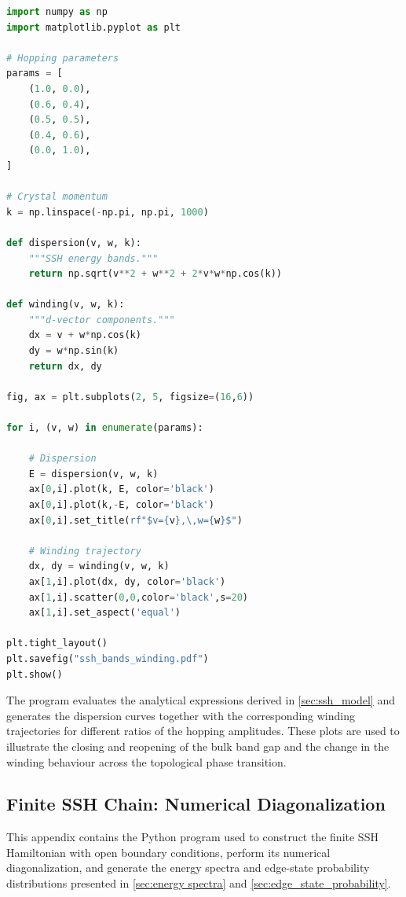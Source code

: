\documentclass[11pt, a4paper]{article}
\begin{document}
\begin{lstlisting}[language=Python, caption={Python implementation used to generate the SSH band structure and winding trajectories.}, label={lst:ssh_plot}]
import numpy as np
import matplotlib.pyplot as plt

# Hopping parameters
params = [
    (1.0, 0.0),
    (0.6, 0.4),
    (0.5, 0.5),
    (0.4, 0.6),
    (0.0, 1.0),
]

# Crystal momentum
k = np.linspace(-np.pi, np.pi, 1000)

def dispersion(v, w, k):
    """SSH energy bands."""
    return np.sqrt(v**2 + w**2 + 2*v*w*np.cos(k))

def winding(v, w, k):
    """d-vector components."""
    dx = v + w*np.cos(k)
    dy = w*np.sin(k)
    return dx, dy

fig, ax = plt.subplots(2, 5, figsize=(16,6))

for i, (v, w) in enumerate(params):

    # Dispersion
    E = dispersion(v, w, k)
    ax[0,i].plot(k, E, color='black')
    ax[0,i].plot(k,-E, color='black')
    ax[0,i].set_title(rf"$v={v},\,w={w}$")

    # Winding trajectory
    dx, dy = winding(v, w, k)
    ax[1,i].plot(dx, dy, color='black')
    ax[1,i].scatter(0,0,color='black',s=20)
    ax[1,i].set_aspect('equal')

plt.tight_layout()
plt.savefig("ssh_bands_winding.pdf")
plt.show()
\end{lstlisting}

The program evaluates the analytical expressions derived in \cref{sec:ssh_model} and generates the dispersion curves together with the corresponding winding trajectories for different ratios of the hopping amplitudes.
These plots are used to illustrate the closing and reopening of the bulk band gap and the change in the winding behaviour across the topological phase transition.

\subsection{Finite SSH Chain: Numerical Diagonalization}

This appendix contains the Python program used to construct the finite SSH Hamiltonian with open boundary conditions, perform its numerical diagonalization, and generate the energy spectra and edge-state probability distributions presented in \cref{sec:energy spectra} and \cref{sec:edge_state_probability}.
\end{document}
